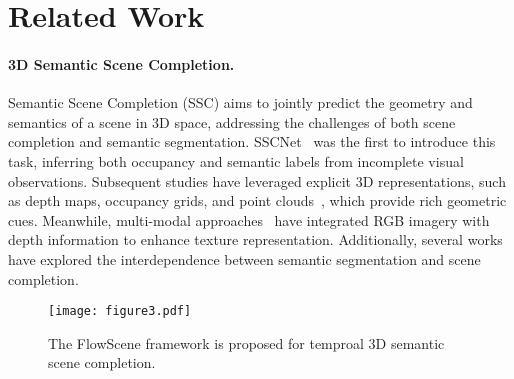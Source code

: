 \section{Related Work}
\paragraph{3D Semantic Scene Completion.}

Semantic Scene Completion (SSC) aims to jointly predict the geometry and semantics of a scene in 3D space, addressing the challenges of both scene completion and semantic segmentation. SSCNet~\cite{song2017semantic} was the first to introduce this task, inferring both occupancy and semantic labels from incomplete visual observations. Subsequent studies have leveraged explicit 3D representations, such as depth maps, occupancy grids, and point clouds~\cite{rist2021semantic,zhang2018efficient,Xia_2023_scpnet}, which provide rich geometric cues. Meanwhile, multi-modal approaches~\cite{cai2021semantic,li2019rgbd} have integrated RGB imagery with depth information to enhance texture representation. Additionally, several works~\cite{yan2021sparse,yang2021ssasc,mei2023sscrs} have explored the interdependence between semantic segmentation and scene completion.
\begin{figure*}[t]
\centering
  \texttt{[image: figure3.pdf]}
  \caption{The FlowScene framework is proposed for temproal 3D semantic scene completion.}
  \label{fig:figure3}
\end{figure*}

